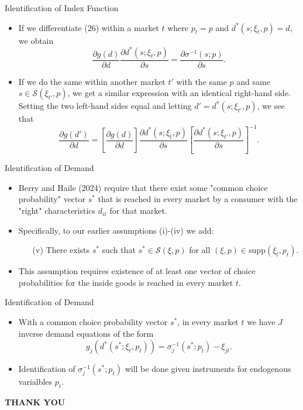 \documentclass[aspectratio=169]{beamer}  %
\begin{document}
\begin{frame}{Identification of Index Function}
    \begin{itemize}
    \item If we differentiate (26) within a market \(t\) where \(p_t = p\) and \(d^*(s; \xi_t, p) = d\), we obtain
    \begin{equation}
        \frac{\partial g(d)}{\partial d} \frac{\partial d^*(s; \xi_t, p)}{\partial s} = \frac{\partial \sigma^{-1}(s; p)}{\partial s}.
    \end{equation}
    \item If we do the same within another market \(t'\) with the same \(p\) and same \(s \in \mathcal{S}(\xi_{t'}, p)\), we get a similar expression with an identical right-hand side. Setting the two left-hand sides equal and letting \(d' = d^*(s; \xi_{t'}, p)\), we see that
    \begin{equation}
        \frac{\partial g(d')}{\partial d} = \left[ \frac{\partial g(d)}{\partial d} \right] \frac{\partial d^*(s; \xi_t, p)}{\partial s} \left[ \frac{\partial d^*(s; \xi_{t'}, p)}{\partial s} \right]^{-1}.
    \end{equation}
    \end{itemize}
\end{frame}

\begin{frame}{Identification of Demand}
    \begin{itemize}
    \item Berry and Haile (2024) require that there exist some "common choice probability" vector \(s^*\) that is reached in every market by a consumer with the "right" characteristics \(d_{it}\) for that market. 
    \item Specifically, to our earlier assumptions (i)-(iv) we add:
        \begin{itemize}
        \item[(v)] There exists \(s^*\) such that \(s^* \in \mathcal{S}(\xi, p)\) for all \((\xi, p) \in \text{supp}(\xi_t, p_t)\).
        \end{itemize}
    \item This assumption requires existence of at least one vector of choice probabilities for the inside goods is reached in every market \(t\).
    \end{itemize}
\end{frame}

\begin{frame}{Identification of Demand}
    \begin{itemize}
    \item With a common choice probability vector \(s^*\), in every market \(t\) we have \(J\) inverse demand equations of the form
        \begin{equation}
            g_j(d^*(s^*; \xi_t, p_t)) = \sigma_j^{-1}(s^*; p_t) - \xi_{jt}.
        \end{equation}
    \item Identification of \(\sigma_j^{-1}(s^*; p_t)\) will be done given instruments for endogenous varialbles \(p_t\).
    \end{itemize}
\end{frame}

\begin{frame}
    \thispagestyle{empty}
    \centering
    \Huge
    \textbf{THANK YOU}
\end{frame}
\end{document}
